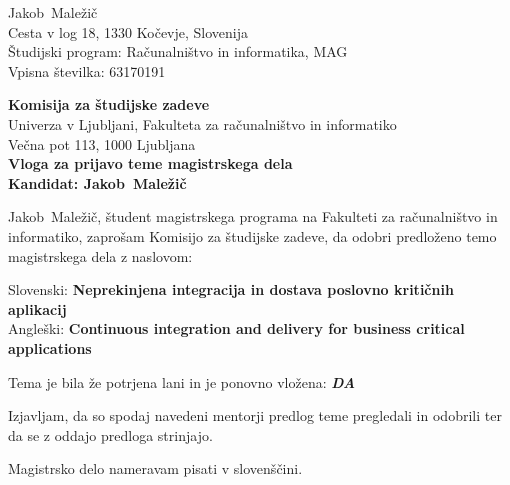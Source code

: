 \documentclass[a4paper, 12pt]{article}
\begin{document}
\newcommand{\ImeKandidata}{Jakob} %
\newcommand{\PriimekKandidata}{Maležič} %
\newcommand{\VpisnaStevilka}{63170191} %
\newcommand{\StudijskiProgram}{Računalništvo in informatika, MAG} %
\newcommand{\NaslovBivalisca}{ Cesta v log 18, 1330 Kočevje, Slovenija } %
\newcommand{\SLONaslov}{Neprekinjena integracija in dostava poslovno kritičnih aplikacij} %
\newcommand{\ENGNaslov}{Continuous integration and delivery for business critical applications} %


\newcommand{\Kandidat}{\ImeKandidata~\PriimekKandidata}
\noindent
\Kandidat\\
\NaslovBivalisca \\
Študijski program: \StudijskiProgram \\
Vpisna številka: \VpisnaStevilka
\bigskip

{\bf Komisija za študijske zadeve}\\
Univerza v Ljubljani, Fakulteta za računalništvo in informatiko\\
Večna pot 113, 1000 Ljubljana\\

{\Large\bf
{\centering
    Vloga za prijavo teme magistrskega dela \\%
\large Kandidat: \Kandidat \\[10mm]}}


\Kandidat, študent magistrskega programa na Fakulteti za računalništvo in informatiko, zaprošam Komisijo za študijske zadeve, da odobri predloženo temo magistrskega dela z naslovom:

Slovenski: {\bf \SLONaslov}\\
Angleški: {\bf \ENGNaslov}

Tema je bila že potrjena lani in je ponovno vložena: {\bf \textit{DA}}

Izjavljam, da so spodaj navedeni mentorji predlog teme pregledali in odobrili ter da se z oddajo predloga strinjajo.

Magistrsko delo nameravam pisati v slovenščini. %
\end{document}
